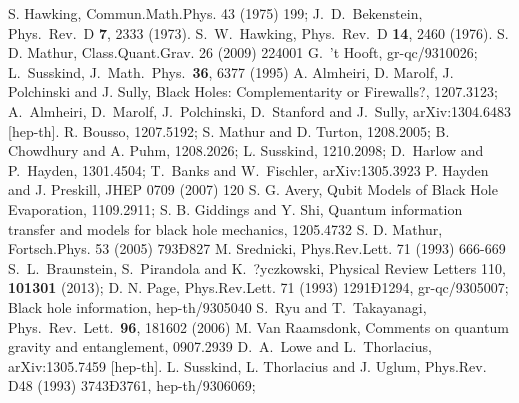 \documentclass[aps,prd,twocolumn,nofootinbib,superscriptaddress,amssymb]{revtex4}
\begin{document}
\begin{thebibliography}{99}
 S. Hawking, %
Commun.Math.Phys. 43 (1975) 199;   J.~D.~Bekenstein, %
 Phys.\ Rev.\ D {\bf 7}, 2333 (1973).
   S.~W.~Hawking,
  Phys.\ Rev.\ D {\bf 14}, 2460 (1976).
    S. D. Mathur, %
 Class.Quant.Grav. 26 (2009) 224001%
  G.~'t Hooft,   gr-qc/9310026;  L.~Susskind,   J.\ Math.\ Phys.\  {\bf 36}, 6377 (1995) 
 A. Almheiri, D. Marolf, J. Polchinski and J. Sully, Black Holes: Complementarity or Firewalls?, 1207.3123;
 A.~Almheiri, D.~Marolf, J.~Polchinski, D.~Stanford and J.~Sully,
    arXiv:1304.6483 [hep-th].
R. Bousso, 1207.5192;
S. Mathur and D. Turton,   1208.2005;
B. Chowdhury and A. Puhm, 1208.2026;  
L. Susskind,  1210.2098; D.~Harlow and P.~Hayden, 1301.4504; T.~Banks and W.~Fischler,
 arXiv:1305.3923 
  P. Hayden and J. Preskill, %
JHEP 0709 (2007) 120
         S. G. Avery, Qubit Models of Black Hole Evaporation, 1109.2911;
S. B. Giddings and Y. Shi, Quantum information transfer and models for black hole mechanics, 1205.4732
        S. D. Mathur,  Fortsch.Phys. 53 (2005) 793Ð827
   M. Srednicki, Phys.Rev.Lett. 71 (1993) 666-669
  S.~L.~Braunstein, S.~Pirandola and K.~?yczkowski,
  Physical Review Letters 110, {\bf 101301} (2013);
          D. N. Page, %
Phys.Rev.Lett. 71 (1993) 1291Ð1294, gr-qc/9305007; Black hole information, hep-th/9305040
 S.~Ryu and T.~Takayanagi,
  Phys.\ Rev.\ Lett.\  {\bf 96}, 181602 (2006)
  M. Van Raamsdonk, Comments on quantum gravity and entanglement, 0907.2939%
  D.~A.~Lowe and L.~Thorlacius,
  arXiv:1305.7459 [hep-th].
  L. Susskind, L. Thorlacius and J. Uglum, Phys.Rev. D48 (1993) 3743Ð3761, hep-th/9306069;

\end{thebibliography}
\end{document}
